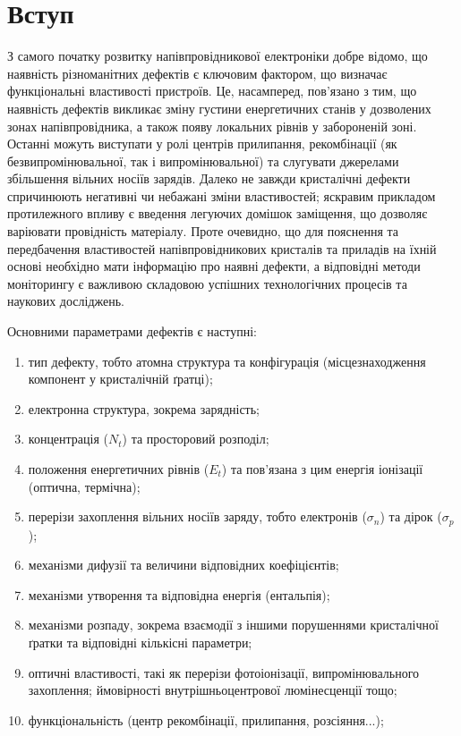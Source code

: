 \chapter*{Вступ}\label{chap0}

З самого початку розвитку напівпровідникової електроніки добре відомо, що наявність
різноманітних дефектів є ключовим фактором, що визначає функціональні властивості пристроїв.
Це, насамперед, пов'язано з тим, що наявність дефектів викликає зміну густини енергетичних станів
у дозволених зонах напівпровідника, а також
появу локальних рівнів у забороненій зоні.
Останні можуть виступати у ролі центрів прилипання, рекомбінації (як безвипромінювальної, так і випромінювальної) та
слугувати джерелами збільшення вільних носіїв зарядів.
Далеко не завжди кристалічні дефекти спричинюють негативні чи небажані зміни властивостей;
яскравим прикладом протилежного впливу є введення легуючих домішок заміщення, що дозволяє варіювати
провідність матеріалу.
Проте очевидно, що для пояснення та передбачення властивостей напівпровідникових кристалів та приладів
на їхній основі необхідно мати інформацію про наявні дефекти, а відповідні методи
моніторингу є важливою складовою успішних технологічних процесів та наукових досліджень.

Основними параметрами дефектів є наступні:
\begin{enumerate}[label=\arabic*),leftmargin=0em,itemindent=1.5em]
\item тип дефекту, тобто атомна структура та конфігурація (місцезнаходження компонент у кристалічній ґратці);
\item електронна структура, зокрема зарядність;
\item концентрація ($N_t$) та просторовий розподіл;
\item положення енергетичних рівнів ($E_t$) та пов'язана з цим енергія іонізації (оптична, термічна);
\item перерізи захоплення вільних носіїв заряду, тобто електронів ($\sigma_n$) та дірок ($\sigma_p$);
\item механізми дифузії та величини відповідних коефіцієнтів;
\item механізми утворення та відповідна енергія (ентальпія);
\item механізми розпаду, зокрема взаємодії з іншими порушеннями кристалічної ґратки та відповідні кількісні параметри;
\item оптичні властивості, такі як перерізи фотоіонізації, випромінювального захоплення;
ймовірності внутрішньоцентрової люмінесценції тощо;
\item функціональність (центр рекомбінації, прилипання, розсіяння...);
\end{enumerate}

